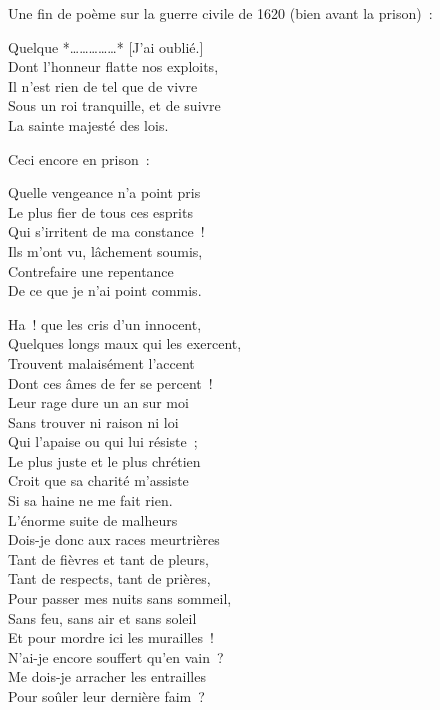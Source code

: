 \documentclass[french,twoside]{book} %
\newenvironment{quoteblock}%
  {\begin{quoting}}
  {\end{quoting}}
\newenvironment{quotebar}{%
    \def\FrameCommand{{\color{rubric!10!}\vrule width 0.5em} \hspace{0.9em}}%
    \def\OuterFrameSep{\itemsep} %
    \MakeFramed {\advance\hsize-\width \FrameRestore}
  }%
  {%
    \endMakeFramed
  }
\renewenvironment{quoteblock}%
  {%
    \savenotes
    \setstretch{0.9}
    \normalfont
    \begin{quotebar}
  }
  {%
    \end{quotebar}
    \spewnotes
  }
\begin{document}
\noindent Une fin de poème sur la guerre civile de 1620 (bien avant la prison) :\par

\begin{quoteblock}
 \noindent Quelque *……………* [J'ai oublié.] \\
Dont l'honneur flatte nos exploits, \\
Il n'est rien de tel que de vivre \\
Sous un roi tranquille, et de suivre \\
La sainte majesté des lois.
 \end{quoteblock}

\noindent Ceci encore en prison :\par

\begin{quoteblock}
 \noindent Quelle vengeance n'a point pris \\
Le plus fier de tous ces esprits \\
Qui s'irritent de ma constance ! \\
Ils m'ont vu, lâchement soumis, \\
Contrefaire une repentance \\
De ce que je n'ai point commis.\par
 Ha ! que les cris d'un innocent, \\
Quelques longs maux qui les exercent, \\
Trouvent malaisément l'accent \\
Dont ces âmes de fer se percent ! \\
Leur rage dure un an sur moi \\
Sans trouver ni raison ni loi \\
Qui l'apaise ou qui lui résiste ; \\
Le plus juste et le plus chrétien \\
Croit que sa charité m'assiste \\
Si sa haine ne me fait rien. \\
L'énorme suite de malheurs \\
Dois-je donc aux races meurtrières \\
Tant de fièvres et tant de pleurs, \\
Tant de respects, tant de prières, \\
Pour passer mes nuits sans sommeil, \\
Sans feu, sans air et sans soleil \\
Et pour mordre ici les murailles ! \\
N'ai-je encore souffert qu'en vain ? \\
Me dois-je arracher les entrailles \\
Pour soûler leur dernière faim ?
 \end{quoteblock}
\end{document}
